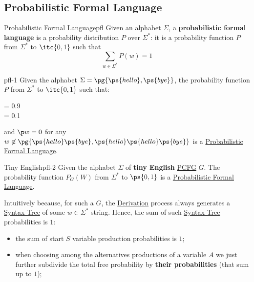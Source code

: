 \subsection{Probabilistic Formal Language}\label{sub:lm_probabilistic_formal_language} %
\begin{definition}{Probabilistic Formal Language}{pfl}
    Given an alphabet $\Sigma$, a \textbf{probabilistic formal language} is a probability distribution $P$ over $\Sigma^*$: it is a probability function $P$ from $\Sigma^*$ to $\itc{0,1}$ such that
    \[
        \sum_{w \in \Sigma^*}P(w) = 1
    \]
\end{definition}
\begin{example}{}{pfl-1}
    Given the alphabet $\Sigma = \pg{\ps{hello}, \ps{bye}}$, the probability function $P$ from $\Sigma^*$ to $\itc{0,1}$ such that:
    \begin{ceq}
         = 0.9 \\
         = 0.1
    \end{ceq}
    and $\p w = 0$ for any $w\not\in \pg{\ps{hello}\ps{bye}, \ps{hello}\ps{hello}\ps{bye}}$ is a \hyperref[def:pfl]{Probabilistic Formal Language}.
\end{example}
\begin{example}{Tiny English}{pfl-2}
    Given the alphabet $\Sigma$ of \textbf{tiny English} \hyperref[def:pcfg]{PCFG} $G$.
    The probability function $P_G(W)$ from $\Sigma^*$ to $\ps{0,1}$ is a \hyperref[def:pfl]{Probabilistic Formal Language}.
    \begin{note}
        Intuitively because, for such a $G$, the \hyperref[def:pg-derivation]{Derivation} process always generates a \hyperref[def:pg-syntax-tree]{Syntax Tree} of some $w\in \Sigma^*$ string.
        Hence, the sum of such \hyperref[def:pg-syntax-tree]{Syntax Tree} probabilities is $1$:
        \begin{itemize}
            \item the sum of start $S$ variable production probabilities is $1$;
            \item when choosing among the alternatives productions of a variable $A$ we just further subdivide the total free probability by \textbf{their probabilities} (that sum up to $1$);
        \end{itemize}
    \end{note}
\end{example}
%
